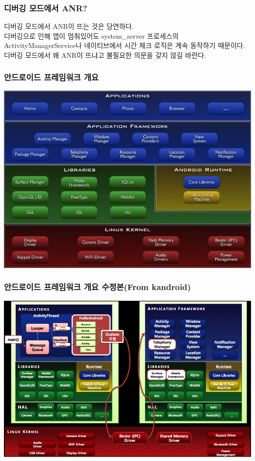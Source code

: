 \documentclass{beamer}
\begin{document}
\begin{frame}
\frametitle{디버깅 모드에서 ANR?}
디버깅 모드에서 ANR이 뜨는 것은 당연하다.\\
디버깅으로 인해 앱이 멈춰있어도 system\_server 프로세스의 ActivityManagerService나 네이티브에서 시간 체크 로직은 계속 동작하기 때문이다. 디버깅 모드에서 왜 ANR이 뜨냐고 불필요한 의문을 갖지 않길 바란다.
\end{frame}

\begin{frame}
\frametitle{안드로이드 프레임워크 개요}
\includegraphics[scale=0.35]{system-architecture}
\end{frame}

\begin{frame}
\frametitle{안드로이드 프레임워크 개요 수정본(From kandroid)}
\includegraphics[scale=0.3]{kandroid-framework}
\end{frame}
\end{document}

